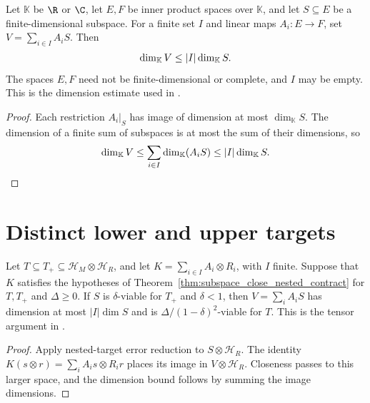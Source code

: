 \begin{theorem}
    \label{thm:finite_image_span_dimension}
    \leanok
    Let $\mathbb K$ be $\R$ or $\C$, let $E,F$ be inner product spaces over
    $\mathbb K$, and let $S\subseteq E$ be a finite-dimensional subspace.
    For a finite set $I$ and linear maps $A_i:E\to F$, set
    $V=\sum_{i\in I}A_iS$. Then
    \begin{align}
        \dim_{\mathbb K}V\le |I|\dim_{\mathbb K}S.\notag
    \end{align}
    The spaces $E,F$ need not be finite-dimensional or complete, and $I$ may be empty.
    This is the dimension estimate used in
    \cite[Lemma~2.9 and Proposition~4.10]{Arad2016RigorousRG}.
\end{theorem}
\begin{proof}
    \leanok
    Each restriction $A_i|_S$ has image of dimension at most
    $\dim_{\mathbb K}S$. The dimension of a finite sum of subspaces is at most
    the sum of their dimensions, so
    \begin{align}
        \dim_{\mathbb K}V
        \le\sum_{i\in I}\dim_{\mathbb K}(A_iS)
        \le |I|\dim_{\mathbb K}S.\notag
    \end{align}
\end{proof}

\section{Distinct lower and upper targets}

\begin{theorem}
    \label{thm:viable_nested_tensor_decomposition}
    \leanok
    Let $T\subseteq T_+\subseteq\mathcal H_M\otimes\mathcal H_R$,
    and let $K=\sum_{i\in I}A_i\otimes R_i$, with $I$ finite.
    Suppose that $K$ satisfies the hypotheses of
    Theorem~\ref{thm:subspace_close_nested_contract} for $T,T_+$ and
    $\Delta\ge0$. If $S$ is $\delta$-viable for $T_+$ and $\delta<1$,
    then $V=\sum_i A_iS$ has dimension at most $|I|\dim S$ and is
    $\Delta/(1-\delta)^2$-viable for $T$.
    This is the tensor argument in
    \cite[Theorem~4.8, lines 1037--1041]{Arad2016RigorousRG}.
\end{theorem}
\begin{proof}\leanok
    Apply nested-target error reduction to $S\otimes\mathcal H_R$.
    The identity $K(s\otimes r)=\sum_i A_is\otimes R_ir$ places its
    image in $V\otimes\mathcal H_R$. Closeness passes to this larger
    space, and the dimension bound follows by summing the image dimensions.
\end{proof}


